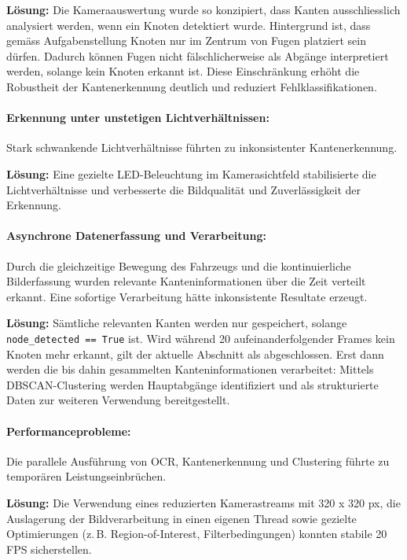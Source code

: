 \documentclass[main.tex]{subfiles} %
\begin{document}
\textbf{Lösung:}  
Die Kameraauswertung wurde so konzipiert, dass Kanten ausschliesslich analysiert 
werden, wenn ein Knoten detektiert wurde. Hintergrund ist, dass gemäss Aufgabenstellung 
Knoten nur im Zentrum von Fugen platziert sein dürfen. Dadurch können Fugen nicht 
fälschlicherweise als Abgänge interpretiert werden, solange kein Knoten erkannt ist. 
Diese Einschränkung erhöht die Robustheit der Kantenerkennung deutlich und reduziert 
Fehlklassifikationen.

\paragraph{Erkennung unter unstetigen Lichtverhältnissen:}  
Stark schwankende Lichtverhältnisse führten zu inkonsistenter Kantenerkennung.

\textbf{Lösung:}  
Eine gezielte LED-Beleuchtung im Kamerasichtfeld stabilisierte die Lichtverhältnisse 
und verbesserte die Bildqualität und Zuverlässigkeit der Erkennung.

\paragraph{Asynchrone Datenerfassung und Verarbeitung:}  
Durch die gleichzeitige Bewegung des Fahrzeugs und die kontinuierliche Bilderfassung 
wurden relevante Kanteninformationen über die Zeit verteilt erkannt. Eine sofortige 
Verarbeitung hätte inkonsistente Resultate erzeugt.

\textbf{Lösung:}  
Sämtliche relevanten Kanten werden nur gespeichert, solange \texttt{node\_detected == True} 
ist. Wird während 20 aufeinanderfolgender Frames kein Knoten mehr erkannt, gilt der 
aktuelle Abschnitt als abgeschlossen. Erst dann werden die bis dahin gesammelten 
Kanteninformationen verarbeitet: Mittels DBSCAN-Clustering werden Hauptabgänge 
identifiziert und als strukturierte Daten zur weiteren Verwendung bereitgestellt.

\paragraph{Performanceprobleme:}  
Die parallele Ausführung von OCR, Kantenerkennung und Clustering führte zu temporären 
Leistungseinbrüchen.

\textbf{Lösung:}  
Die Verwendung eines reduzierten Kamerastreams mit 320 x 320 px, die Auslagerung 
der Bildverarbeitung in einen eigenen Thread sowie gezielte Optimierungen 
(z.\,B. Region-of-Interest, Filterbedingungen) konnten stabile 20 FPS 
sicherstellen.
\end{document}
